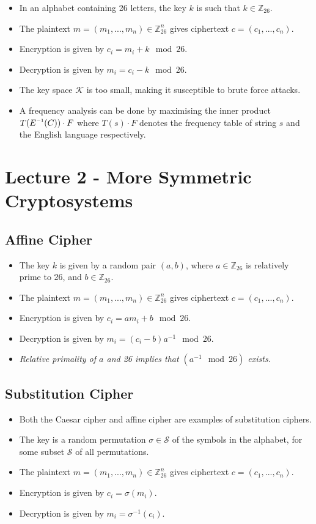 \documentclass[a4paper]{scrartcl}
\newcommand{\inv}{^{\raisebox{.2ex}{$\scriptscriptstyle-1$}}}
\begin{document}
\begin{itemize}
\item In an alphabet containing 26 letters, the key $k$ is such that $k \in \mathbb{Z}_{26}$.
\item The plaintext $m = (m_1, ..., m_n) \in \mathbb{Z}_{26}^{n}$ gives ciphertext $c = (c_1, ..., c_n)$.
\item Encryption is given by $c_i = m_i + k \mod 26$.
\item Decryption is given by $m_i = c_i - k \mod 26$.
\item The key space ${\mathcal {K}}$ is too small, making it susceptible to brute force attacks.
\item A frequency analysis can be done by maximising the inner product $T(E\inv(C)) \cdot F$ where $T(s) \cdot F$ denotes the frequency table of string $s$ and the English language respectively.
\end{itemize}

\section*{Lecture 2 - More Symmetric Cryptosystems}

\subsection*{Affine Cipher}

\begin{itemize}
\item The key $k$ is given by a random pair $(a, b)$, where $a \in \mathbb{Z}_{26}$ is relatively prime to 26, and $b \in \mathbb{Z}_{26}$.
\item The plaintext $m = (m_1, ..., m_n) \in \mathbb{Z}_{26}^{n}$ gives ciphertext $c = (c_1, ..., c_n)$.
\item Encryption is given by $c_i = am_i + b \mod 26$.
\item Decryption is given by $m_i = (c_i - b)a^{-1} \mod 26$.
\item \textsl{Relative primality of $a$ and 26 implies that $(a^{-1} \mod 26)$ exists.}
\end{itemize}

\subsection*{Substitution Cipher}

\begin{itemize}
\item Both the Caesar cipher and affine cipher are examples of substitution ciphers.
\item The key is a random permutation $\sigma \in {\mathcal {S}}$ of the symbols in the alphabet, for some subset ${\mathcal {S}}$ of all permutations.
\item The plaintext $m = (m_1, ..., m_n) \in \mathbb{Z}_{26}^{n}$ gives ciphertext $c = (c_1, ..., c_n)$.
\item Encryption is given by $c_i = \sigma(m_i)$.
\item Decryption is given by $m_i = \sigma^{-1}(c_i)$.
\end{itemize}
\end{document}

